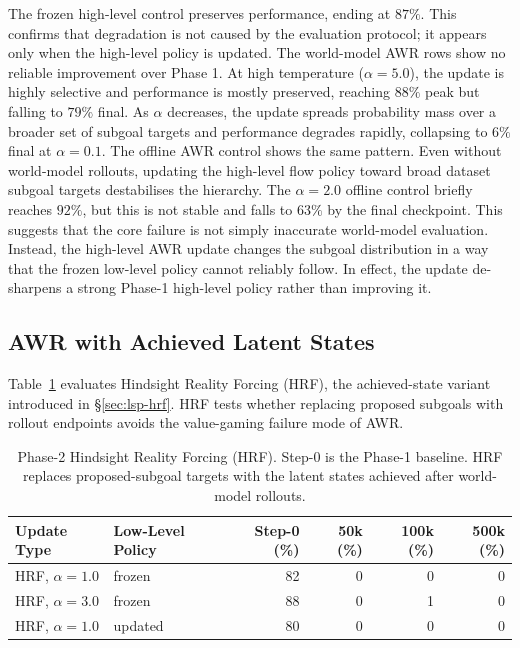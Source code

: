 The frozen high-level control preserves performance, ending at
$87\%$. This confirms that degradation is not caused by the evaluation
protocol; it appears only when
the high-level policy is updated.
The world-model AWR rows show no reliable improvement over Phase 1.
At high temperature ($\alpha=5.0$), the update is highly selective and
performance is mostly preserved, reaching $88\%$ peak but falling to
$79\%$ final. As $\alpha$ decreases, the update spreads probability mass
over a broader set of subgoal targets and performance degrades rapidly,
collapsing to $6\%$ final at $\alpha=0.1$.
The offline AWR control shows the same pattern. Even without world-model
rollouts, updating the high-level flow policy toward broad dataset
subgoal targets destabilises the hierarchy. The $\alpha=2.0$ offline
control briefly reaches $92\%$, but this is not stable and falls to
$63\%$ by the final checkpoint. This suggests that the core failure is
not simply inaccurate world-model evaluation. Instead, the high-level
AWR update changes the subgoal distribution in a way that the frozen
low-level policy cannot reliably follow. In effect, the update
de-sharpens a strong Phase-1 high-level policy rather than improving it.

\subsection{AWR with Achieved Latent States}
\label{sec:exp-phase2-hrf}

Table~\ref{tab:lsp-hrf} evaluates Hindsight Reality Forcing (HRF), the
achieved-state variant introduced in \S\ref{sec:lsp-hrf}. HRF tests
whether replacing proposed subgoals with rollout endpoints avoids the
value-gaming failure mode of AWR.

\begin{table}[h]
\centering
\caption{Phase-2 Hindsight Reality Forcing (HRF). Step-0 is the
Phase-1 baseline. HRF replaces proposed-subgoal targets with the latent
states achieved after world-model rollouts.}
\label{tab:lsp-hrf}
\begin{tabular}{llrrrr}
\toprule
Update Type & Low-Level Policy & Step-0 (\%) & 50k (\%) & 100k (\%) & 500k (\%) \\
\midrule
HRF, $\alpha=1.0$ & frozen  & 82 & 0 & 0 & 0 \\
HRF, $\alpha=3.0$ & frozen  & 88 & 0 & 1 & 0 \\
HRF, $\alpha=1.0$ & updated & 80 & 0 & 0 & 0 \\
\bottomrule
\end{tabular}
\end{table}

